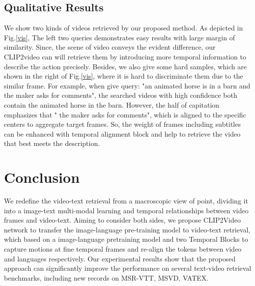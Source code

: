 \documentclass[final]{cvpr}
\begin{document}
  
  
\subsection{Qualitative Results}
We show two kinds of videos retrieved by our proposed method.  As depicted in Fig.\ref{vis}, The left two queries demonstrates easy results with large margin of similarity. Since, the scene of video conveys the evident difference, our CLIP2video can will retrieve them by introducing more temporal information to describe the action precisely. Besides, we also give some hard samples, which are shown in the right of Fig.\ref{vis}, where it is hard to discriminate them due to the similar frame. For example, when give query: "an animated horse is in a barn and the maker asks for comments", the searched videos with high confidence both contain the animated horse in the barn. However, the half of capitation emphasizes that " the maker asks for comments", which is aligned to the specific centers to aggregate target frames. So, the weight of frames including subtitles can be enhanced with temporal alignment block and help to retrieve the video that best meets the description.



\section{Conclusion}
We redefine the video-text retrieval from a macroscopic view of point, dividing it into a image-text multi-modal learning and temporal relationships between video frames and video-text. Aiming to consider both sides, we propose CLIP2Video network to transfer the image-language pre-training model to video-text retrieval, which based on a image-language pretraining model and two Temporal Blocks to capture motions at fine temporal frames and re-align the tokens between video and languages respectively. Our experimental results show that the proposed approach can significantly improve the performance on several text-video retrieval benchmarks, including new records on MSR-VTT, MSVD, VATEX. 



{\small


}
\end{document}
